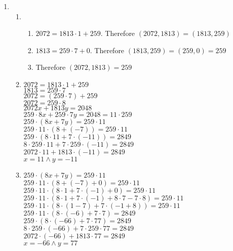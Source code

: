 \documentclass[12pt,letterpaper]{article}
\begin{document}
\begin{enumerate}[leftmargin=0cm]
\item %
\begin{enumerate} %
\item 
\begin{enumerate} %
\item $2072 = 1813 \cdot 1 + 259$. Therefore $(2072, 1813) = (1813, 259)$
\item $1813 = 259 \cdot 7 + 0$. Therefore $(1813, 259) = (259, 0) = 259$
\item Therefore $(2072, 1813) = 259$
\end{enumerate}
\item 
$2072 = 1813 \cdot 1 + 259$ \\
$1813 = 259 \cdot 7$ \\
$2072 = (259 \cdot 7) + 259$ \\
$2072 = 259 \cdot 8$ \\
$2072 x + 1813 y = 2048$ \\
$259 \cdot 8 x + 259 \cdot 7 y = 2048 = 11 \cdot 259$ \\
$259 \cdot (8x + 7y) = 259 \cdot 11$ \\
$259 \cdot 11 \cdot (8 + (-7)) = 259 \cdot 11$ \\
$259 \cdot (8 \cdot 11 + 7 \cdot (-11)) = 2849$ \\
$8 \cdot 259 \cdot 11 + 7 \cdot 259 \cdot (-11) = 2849$ \\
$2072 \cdot 11 +  1813 \cdot (-11) = 2849$ \\
$x = 11 \wedge y = -11$ \\
\item 
$259 \cdot (8x + 7y) = 259 \cdot 11$ \\
$259 \cdot 11 \cdot (8 + (-7) + 0) = 259 \cdot 11$ \\
$259 \cdot 11 \cdot (8 \cdot 1 + 7 \cdot (-1) + 0) = 259 \cdot 11$ \\
$259 \cdot 11 \cdot (8 \cdot 1 + 7 \cdot (-1) + 8 \cdot 7 - 7\cdot 8) = 259 \cdot 11$ \\
$259 \cdot 11 \cdot (8 \cdot (1 - 7) + 7 \cdot (-1 + 8)) = 259 \cdot 11$ \\
$259 \cdot 11 \cdot (8 \cdot (-6) + 7 \cdot 7) = 2849$ \\
$259 \cdot (8 \cdot (-66) + 7 \cdot 77) = 2849$ \\
$8 \cdot 259 \cdot (-66) + 7 \cdot 259 \cdot 77 = 2849$ \\
$2072 \cdot (-66) + 1813 \cdot 77 = 2849$ \\
$x = -66 \wedge y = 77$ \\
\end{enumerate}


\end{enumerate}
\end{document}
